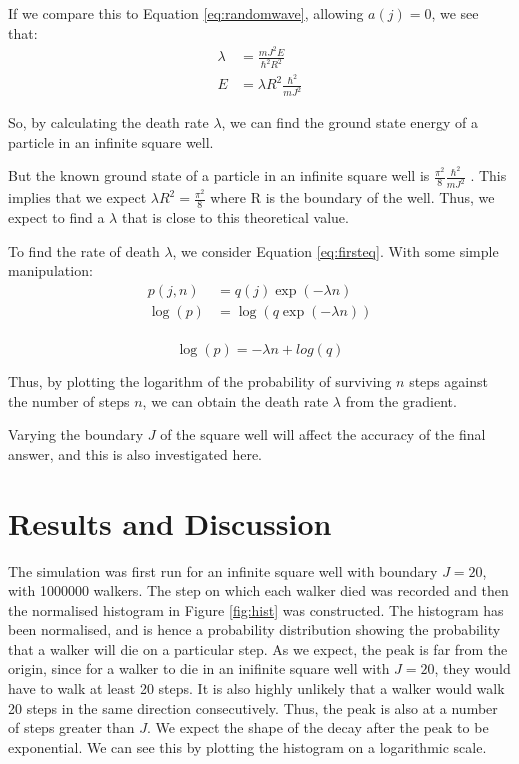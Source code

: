 \documentclass[journal]{IEEEtran}
\begin{document}
If we compare this to Equation \ref{eq:randomwave}, allowing $a(j) = 0$, we see
that:
\begin{equation}
  \begin{split}
    \lambda &= \frac{mJ^2E}{\hbar^2R^2} \\
    E &= \lambda R^2 \frac{\hbar^2}{mJ^2}
  \end{split}
  \nonumber
\end{equation}

So, by calculating the death rate $\lambda$, we can find the ground state energy
of a particle in an infinite square well.

But the known ground state of a particle in an infinite square well is
$\frac{\pi^2}{8}\frac{\hbar^2}{mJ^2}$ . This implies that we expect $\lambda
R^2=\frac{\pi^2}{8}$ where R is the boundary of the well. Thus, we expect to
find a $\lambda$ that is close to this theoretical value.


To find the rate of death $\lambda$, we consider Equation \ref{eq:firsteq}. With
some simple manipulation:
\begin{equation}
  \begin{split}
    p(j, n) & = q(j) \exp(-\lambda n)\\
    \log(p) & = \log(q \exp(-\lambda n)) \\
  \end{split}
  \nonumber
\end{equation}

\begin{equation}
  \log(p) = -\lambda n + log(q)
  \label{eq:straightline}
\end{equation}

Thus, by plotting the logarithm of the probability of surviving $n$ steps
against the number of steps $n$, we can obtain the death rate $\lambda$ from the
gradient.

Varying the boundary $J$ of the square well will affect the accuracy of the
final answer, and this is also investigated here.


\section{Results and Discussion}
The simulation was first run for an infinite square well with boundary $J = 20$,
with 1000000 walkers. The step on which each walker died was recorded and then
the normalised histogram in Figure \ref{fig:hist} was constructed. The histogram
has been normalised, and is hence a probability distribution showing the
probability that a walker will die on a particular step. As we expect, the peak
is far from the origin, since for a walker to die in an inifinite square well
with $J=20$, they would have to walk at least 20 steps. It is also highly
unlikely that a walker would walk 20 steps in the same direction
consecutively. Thus, the peak is also at a number of steps greater than $J$. We
expect the shape of the decay after the peak to be exponential. We can see this
by plotting the histogram on a logarithmic scale.
\end{document}

